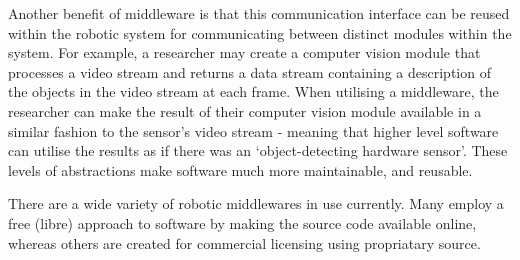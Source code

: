 \documentclass[../dissertation.tex]{subfiles}
\begin{document}
Another benefit of middleware is that this communication interface can be reused within the robotic system for communicating between distinct modules within the system. For example, a researcher may create a computer vision module that processes a video stream and returns a data stream containing a description of the objects in the video stream at each frame. When utilising a middleware, the researcher can make the result of their computer vision module available in a similar fashion to the sensor's video stream - meaning that higher level software can utilise the results as if there was an `object-detecting hardware sensor'. These levels of abstractions make software much more maintainable, and reusable.

There are a wide variety of robotic middlewares in use currently. Many employ a free (libre) approach to software by making the source code available online, whereas others are created for commercial licensing using propriatary source.
\end{document}
